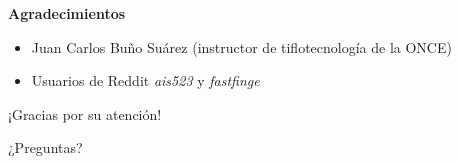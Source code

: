 \begin{tframe}{\textbf{Agradecimientos}}
	\begin{itemize}
		\item Juan Carlos Buño Suárez (instructor de tiflotecnología de la ONCE)
		\item Usuarios de Reddit \textit{ais523} y \textit{fastfinge}
	\end{itemize}
\end{tframe}


\begin{frame}[c]{}
	\begin{center}
		\Huge ¡Gracias por su atención!
	\end{center}
\end{frame}

\begin{frame}[c]{}
	\begin{center}
		\Huge ¿Preguntas?
	\end{center}
\end{frame}